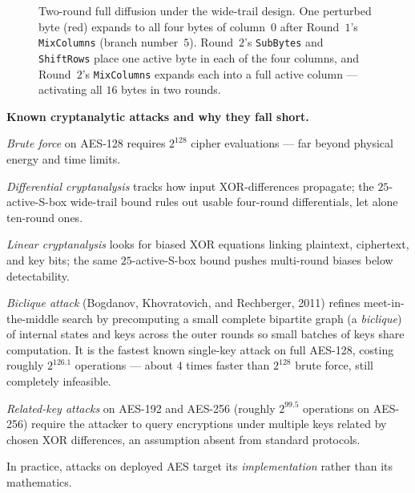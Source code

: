 \begin{figure}[htbp]
\caption{Two-round full diffusion under the wide-trail design. One perturbed byte (red) expands to all four bytes of column~$0$ after Round~$1$'s \texttt{MixColumns} (branch number~$5$). Round~$2$'s \texttt{SubBytes} and \texttt{ShiftRows} place one active byte in each of the four columns, and Round~$2$'s \texttt{MixColumns} expands each into a full active column --- activating all $16$ bytes in two rounds.}
\label{ch12:fig-wide-trail}
\end{figure}

\begin{attackbox}
\textbf{Known cryptanalytic attacks and why they fall short.}

\emph{Brute force} on AES-128 requires $2^{128}$ cipher evaluations --- far beyond
physical energy and time limits.

\emph{Differential cryptanalysis} tracks how input XOR-differences propagate; the
$25$-active-S-box wide-trail bound rules out usable four-round differentials, let
alone ten-round ones.

\emph{Linear cryptanalysis} looks for biased XOR equations linking plaintext,
ciphertext, and key bits; the same $25$-active-S-box bound pushes multi-round
biases below detectability.

\emph{Biclique attack} (Bogdanov, Khovratovich, and Rechberger, 2011) refines
meet-in-the-middle search by precomputing a small complete bipartite graph (a
\emph{biclique}) of internal states and keys across the outer rounds so small
batches of keys share computation. It is the fastest known single-key attack on
full AES-128, costing roughly $2^{126.1}$ operations --- about $4$ times faster
than $2^{128}$ brute force, still completely infeasible.

\emph{Related-key attacks} on AES-192 and AES-256 (roughly $2^{99.5}$ operations
on AES-256) require the attacker to query encryptions under multiple keys related
by chosen XOR differences, an assumption absent from standard protocols.

In practice, attacks on deployed AES target its \emph{implementation} rather than
its mathematics.
\end{attackbox}

